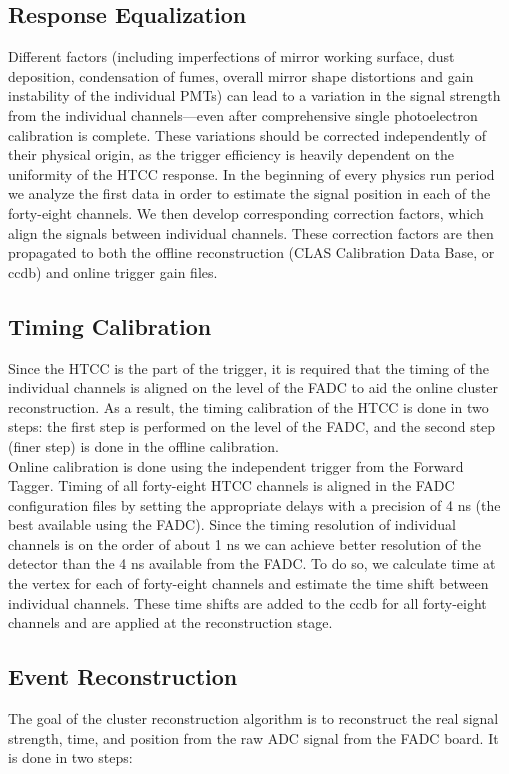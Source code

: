 \subsection{Response Equalization} Different factors (including imperfections of mirror working surface, dust deposition, condensation of fumes, overall mirror shape distortions and gain instability of the individual PMTs) can lead to a variation in the signal strength from the individual channels---even after comprehensive single photoelectron calibration is complete. These variations should be corrected independently of their physical origin, as the trigger efficiency is heavily dependent on the uniformity of the HTCC response. In the beginning of every physics run period we analyze the first data in order to estimate the signal position in each of the forty-eight channels. We then develop corresponding correction factors, which align the signals between individual channels. These correction factors are then propagated to both the offline reconstruction (CLAS Calibration Data Base, or ccdb) and online trigger gain files.

\subsection{Timing Calibration} Since the HTCC is the part of the trigger, it is required that the timing of the individual channels is aligned on the level of the FADC to aid the online cluster reconstruction. As a result, the timing calibration of the HTCC is done in two steps: the first step is performed on the level of the FADC, and the second step (finer step) is done in the offline calibration. \\
\indent Online calibration is done using the independent trigger from the Forward Tagger. Timing of all forty-eight HTCC channels is aligned in the FADC configuration files by setting the appropriate delays with a precision of 4 ns (the best available using the FADC). Since the timing resolution of individual channels is on the order of about 1 ns we can achieve better resolution of the detector than the 4 ns available from the FADC. To do so, we calculate time at the vertex for each of forty-eight channels and estimate the time shift between individual channels. These time shifts are added to the ccdb for all forty-eight channels and are applied at the reconstruction stage.

\subsection{Event Reconstruction} The goal of the cluster reconstruction algorithm is to reconstruct the real signal strength, time, and position from the raw ADC signal from the FADC board. It is done in two steps:

